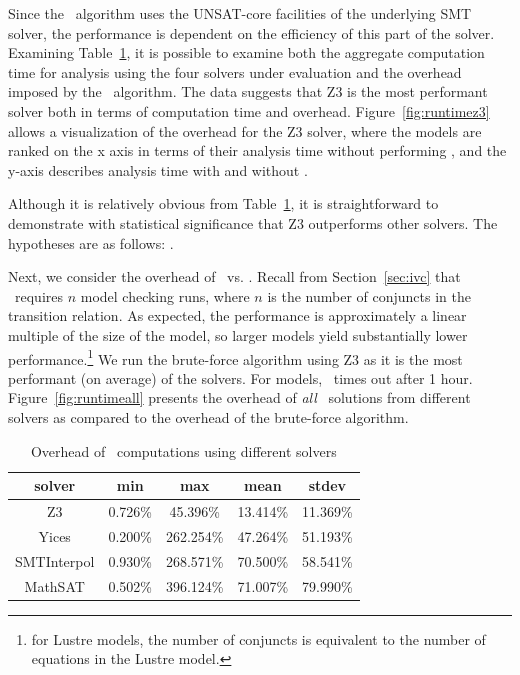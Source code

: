 Since the \ucalg\ algorithm uses the UNSAT-core facilities of the underlying SMT solver, the performance is dependent on the efficiency of this part of the solver.  Examining Table~\ref{tab:overhead}, it is possible to examine both the aggregate computation time for analysis using the four solvers under evaluation and the overhead imposed by the \ucalg\ algorithm.  The data suggests that Z3 is the most performant solver both in terms of computation time and overhead.  Figure~\ref{fig:runtimez3} allows a visualization of the overhead for the Z3 solver, where the models are ranked on the x axis in terms of their analysis time without performing \ucalg, and the y-axis describes analysis time with and without \ucalg.


Although it is relatively obvious from Table~\ref{tab:overhead}, it is straightforward to demonstrate with statistical significance that Z3 outperforms other solvers.  The hypotheses are as follows: .


Next, we consider the overhead of \ucalg\ vs. \bfalg.  Recall from Section~\ref{sec:ivc} that \bfalg\ requires $n$ model checking runs, where $n$ is the number of conjuncts in the transition relation. As expected, the performance is approximately a linear multiple of the size of the model, so larger models yield substantially lower performance.\footnote{for Lustre models, the number of conjuncts is equivalent to the number of equations in the Lustre model.}  We run the brute-force algorithm using Z3 as it is the most performant (on average) of the solvers.  For  models, \bfalg\ times out after 1 hour.   Figure~\ref{fig:runtimeall} presents the overhead of {\em all} \ucalg\  solutions from different solvers as compared to the overhead of the brute-force algorithm.


\begin{table}
  \centering
  \begin{tabular}{ |c||c|c|c|c| }
    \hline
     solver & min & max & mean & stdev \\[0.5ex]
    \hline
    Z3   & 0.726\% & 45.396\% & 13.414\% & 11.369\% \\[0.5ex]
    Yices &   0.200\%  & 262.254\%   & 47.264\% & 51.193\% \\[0.5ex]
    SMTInterpol& 0.930\% & 268.571\% &  70.500\% & 58.541\%\\[0.5ex]
    MathSAT & 0.502\% & 396.124\% &  71.007\% & 79.990\%\\[0.5ex]
    \hline
  \end{tabular}
  \caption{Overhead of \ucalg\ computations using different solvers}
  \label{tab:overhead}
\end{table}

